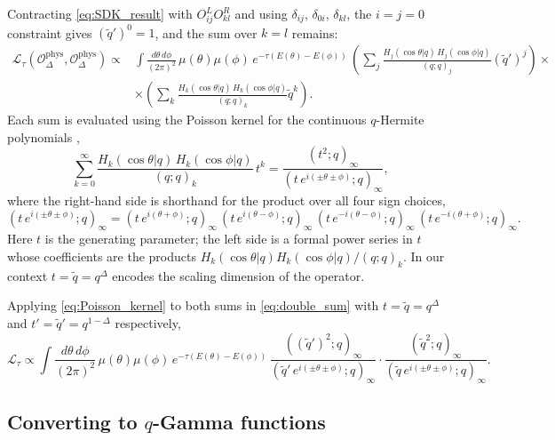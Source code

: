 \documentclass[12pt]{scrarticle}
\newcommand{\phys}{\mathrm{phys}}
\begin{document}
Contracting \eqref{eq:SDK_result} with $O^L_{ij}O^R_{kl}$ and using $\delta_{ij}$,
$\delta_{0i}$, $\delta_{kl}$, the $i=j=0$ constraint gives $(\tilde{q}')^0=1$,
and the sum over $k=l$ remains:
\begin{align}
    \mathcal{L}_\tau(\mathcal{O}^\phys_\Delta, \mathcal{O}^\phys_\Delta)
    \propto
    &\int\frac{d\theta\,d\phi}{(2\pi)^2}\,\mu(\theta)\mu(\phi)\,
    e^{-\tau(E(\theta)-E(\phi))}\,
    \left(\sum_j \frac{H_j(\cos\theta| q)\,H_j(\cos\phi| q)}{(q;q)_j}(\tilde{q}')^j\right)\times \nonumber\\
    &\times\left(\sum_k \frac{H_k(\cos\theta| q)\,H_k(\cos\phi| q)}{(q;q)_k}\tilde{q}^k\right).
    \label{eq:double_sum}
\end{align}
Each sum is evaluated using the Poisson kernel for
the continuous $q$-Hermite polynomials \cite{berkooz_towards_2018},
\begin{equation}
    \sum_{k=0}^\infty \frac{H_k(\cos\theta| q)\,H_k(\cos\phi| q)}{(q;q)_k}\,t^k
    = \frac{(t^2;q)_\infty}{(t\,e^{i(\pm\theta\pm\phi)};q)_\infty},
    \label{eq:Poisson_kernel}
\end{equation}
where the right-hand side is shorthand for the product over all four sign choices,
\begin{equation}
    (t\,e^{i(\pm\theta\pm\phi)};q)_\infty
    = (t\,e^{i(\theta+\phi)};q)_\infty\,(t\,e^{i(\theta-\phi)};q)_\infty\,
      (t\,e^{-i(\theta-\phi)};q)_\infty\,(t\,e^{-i(\theta+\phi)};q)_\infty.
\end{equation}
Here $t$ is the generating parameter; the left side is a formal power series in $t$
whose coefficients are the products $H_k(\cos\theta| q)H_k(\cos\phi| q)/(q;q)_k$.
In our context $t = \tilde{q} = q^\Delta$ encodes the scaling dimension of the operator.

Applying \eqref{eq:Poisson_kernel} to both sums in \eqref{eq:double_sum} with
$t=\tilde{q}=q^\Delta$ and $t'=\tilde{q}'=q^{1-\Delta}$ respectively,
\begin{equation}
    \mathcal{L}_\tau
    \propto
    \int\frac{d\theta\,d\phi}{(2\pi)^2}\,\mu(\theta)\mu(\phi)\,
    e^{-\tau(E(\theta)-E(\phi))}\,
    \frac{((\tilde{q}')^2;q)_\infty}{(\tilde{q}'\,e^{i(\pm\theta\pm\phi)};q)_\infty}
    \cdot
    \frac{(\tilde{q}^2;q)_\infty}{(\tilde{q}\,e^{i(\pm\theta\pm\phi)};q)_\infty}.
    \label{eq:after_identity}
\end{equation}

\subsection{Converting to $q$-Gamma functions}
\end{document}

